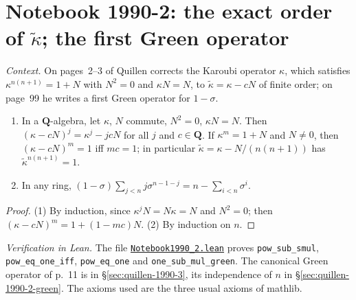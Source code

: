 \section[Notebook 1990-2: the exact order of the corrected Karoubi operator]{Notebook 1990-2: the exact order of $\tilde\kappa$; the first Green operator\protect{}}\label{sec:quillen-1990-2}

\emph{Context.} On pages~2--3 of  Quillen corrects the Karoubi operator $\kappa$, which satisfies $\kappa^{n(n+1)} = 1 + N$ with $N^2 = 0$ and $\kappa N = N$, to $\tilde\kappa = \kappa - cN$ of finite order; on page~99 he writes a first Green operator for $1 - \sigma$.

\begin{encadre}
\begin{theoreme}\label{thm:quillen-1990-2}\leavevmode
\begin{enumerate}
\item In a $\mathbf Q$-algebra, let $\kappa$, $N$ commute, $N^2 = 0$, $\kappa N = N$. Then $(\kappa - cN)^j = \kappa^j - jcN$ for all $j$ and $c \in \mathbf Q$. If $\kappa^m = 1 + N$ and $N \ne 0$, then $(\kappa - cN)^m = 1$ iff $mc = 1$; in particular $\tilde\kappa = \kappa - N/(n(n+1))$ has $\tilde\kappa^{n(n+1)} = 1$.
\item In any ring, $(1 - \sigma)\sum_{j<n}j\sigma^{n-1-j} = n - \sum_{i<n}\sigma^i$.
\end{enumerate}
\end{theoreme}
\end{encadre}

\begin{proof}
(1) By induction, since $\kappa^jN = N\kappa = N$ and $N^2 = 0$; then $(\kappa - cN)^m = 1 + (1 - mc)N$. (2) By induction on $n$.
\end{proof}

\emph{Verification in Lean.} The file \href{\leanblobmain/Notebook1990_2.lean}{\texttt{Notebook1990\_2.\allowbreak{}lean}} proves \texttt{pow\_sub\_smul}, \texttt{pow\_eq\_one\_iff}, \texttt{pow\_eq\_one} and \texttt{one\_sub\_mul\_green}. The canonical Green operator of p.~11 is in \S\ref{sec:quillen-1990-3}, its independence of $n$ in \S\ref{sec:quillen-1990-2-green}. The axioms used are the three usual axioms of mathlib.

